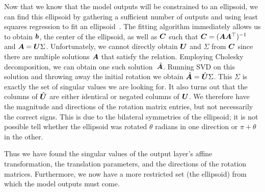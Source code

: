 \documentclass{article}
\begin{document}
Now that we know that the model outputs will be constrained to an ellipsoid,
we can find this ellipsoid by gathering a sufficient number of outputs 
and using least squares regression to fit an ellipsoid~\cite{Bertoni2010PreprintSM}.
The fitting algorithm immediately allows us to obtain \({\bm{b}}\), the center of the ellipsoid,
as well as \({\bm{C}}\) such that \({\bm{C}}=({\bm{A}}{\bm{A}}^\top)^{-1}\) and \({\bm{A}}={\bm{U}}\Sigma\).
Unfortunately, we cannot directly obtain \({\bm{U}}\) and \(\Sigma\) from \({\bm{C}}\)
since there are multiple solutions \({\bm{A}}\) that satisfy the relation.
Employing Cholesky decomposition, 
we can obtain one such solution~\(\hat{{\bm{A}}}\).
Running SVD on this solution and throwing away the initial rotation 
we obtain \(\hat{{\bm{A}}}=\hat{{\bm{U}}}\Sigma\).
This \(\Sigma\) is exactly the set of singular values we are looking for.
It also turns out that the columns of \(\hat{{\bm{U}}}\) are either identical or negated columns of \({\bm{U}}\).
We therefore have the magnitude and directions of the rotation matrix entries, 
but not necessarily the correct signs.
This is due to the bilateral symmetries of the ellipsoid;
it is not possible tell whether the ellipsoid was rotated \(\theta\) radians in one direction
or \(\pi+\theta\) in the other.

Thus we have found the singular values of the output layer's affine transformation,
the translation parameters, and the directions of the rotation matrices.
Furthermore, we now have a more restricted set (the ellipsoid) from which the model outputs must come. 
\end{document}

